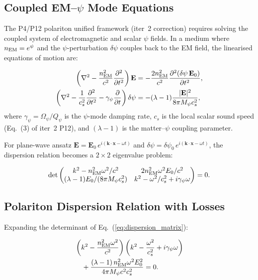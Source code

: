 \documentclass[aps,prd,twocolumn,superscriptaddress,nofootinbib]{revtex4-2}
\newcommand{\Qpsi}{Q_\psi}
\newcommand{\Opsi}{\Omega_\psi}
\begin{document}
\subsection{Coupled EM--$\psi$ Mode Equations}

The P4/P12 polariton unified framework (iter~2 correction) requires
solving the coupled system of electromagnetic and scalar $\psi$ fields.
In a medium where $n_{\rm EM} = e^{\psi}$ and the $\psi$-perturbation
$\delta\psi$ couples back to the EM field, the linearised equations
of motion are:

\begin{align}
\left(\nabla^2 - \frac{n_{\rm EM}^2}{c^2}\frac{\partial^2}{\partial t^2}
\right)\mathbf{E} &= -\frac{2n_{\rm EM}^2}{c^2}
\frac{\partial^2(\delta\psi\,\mathbf{E}_0)}{\partial t^2},
\label{eq:em_coupled}\\
\left(\nabla^2 - \frac{1}{c_s^2}\frac{\partial^2}{\partial t^2}
- \gamma_\psi\frac{\partial}{\partial t}\right)\delta\psi
&= -(\lambda-1)\frac{|\mathbf{E}|^2}{8\pi M_\psi c_s^2},
\label{eq:psi_coupled}
\end{align}
where $\gamma_\psi = \Opsi/\Qpsi$ is the $\psi$-mode damping rate,
$c_s$ is the local scalar sound speed (Eq.~(3) of iter~2 P12), and
$(\lambda-1)$ is the matter--$\psi$ coupling parameter.

For plane-wave ansatz $\mathbf{E} = \mathbf{E}_0\,e^{i(\mathbf{k}\cdot\mathbf{x}-\omega t)}$
and $\delta\psi = \delta\psi_0\,e^{i(\mathbf{k}\cdot\mathbf{x}-\omega t)}$,
the dispersion relation becomes a $2\times2$ eigenvalue problem:

\begin{equation}
\det\begin{pmatrix}
k^2 - n_{\rm EM}^2\omega^2/c^2 & 2n_{\rm EM}^2\omega^2 E_0/c^2 \\
(\lambda-1)E_0/(8\pi M_\psi c_s^2) &
k^2 - \omega^2/c_s^2 + i\gamma_\psi\omega
\end{pmatrix} = 0.
\label{eq:dispersion_matrix}
\end{equation}

\subsection{Polariton Dispersion Relation with Losses}

Expanding the determinant of Eq.~(\ref{eq:dispersion_matrix}):

\begin{align}
&\left(k^2 - \frac{n_{\rm EM}^2\omega^2}{c^2}\right)
\left(k^2 - \frac{\omega^2}{c_s^2} + i\gamma_\psi\omega\right)
\nonumber\\
&\quad + \frac{(\lambda-1)\,n_{\rm EM}^2\omega^2 E_0^2}
{4\pi M_\psi c^2 c_s^2} = 0.
\label{eq:polariton_dispersion}
\end{align}
\end{document}
